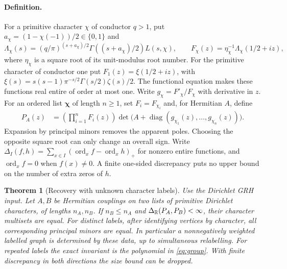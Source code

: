 \documentclass[11pt]{article}
\newtheorem{theorem}{Theorem}[section]
\theoremstyle{remark}\newtheorem{remark}[theorem]{Remark}
\DeclareMathOperator{\ord}{ord}
\DeclareMathOperator{\diag}{diag}
\begin{document}
\paragraph{Definition.}
For a primitive character $\chi$ of conductor $q>1$, put $a_\chi=(1-\chi(-1))/2\in\{0,1\}$ and
\[
 \Lambda_\chi(s)=(q/\pi)^{(s+a_\chi)/2}
       \Gamma((s+a_\chi)/2)L(s,\chi),\qquad
 F_\chi(z)=\eta_\chi^{-1}\Lambda_\chi(1/2+iz),
\]
where $\eta_\chi$ is a square root of its unit-modulus root number. For the primitive character of conductor one put $F_1(z)=\xi(1/2+iz)$, with $\xi(s)=s(s-1)\pi^{-s/2}\Gamma(s/2)\zeta(s)/2$. The functional equation makes these functions real entire of order at most one. Write $g_\chi=F'_\chi/F_\chi$ with derivative in $z$. For an ordered list $\boldsymbol\chi$ of length $n\ge1$, set $F_i=F_{\chi_i}$ and, for Hermitian $A$, define
\begin{align}
 P_A(z)&=\left(\prod_{i=1}^n F_i(z)\right)
 \det\bigl(A+\diag(g_{\chi_1}(z),\ldots,g_{\chi_n}(z))\bigr). \label{eq:model}
\end{align}
Expansion by principal minors removes the apparent poles. Choosing the opposite square root can only change an overall sign. Write $\Delta_I(f,h)=\sum_{x\in I}(\ord_x f-\ord_x h)_+$ for nonzero entire functions, and $\ord_x f=0$ when $f(x)\ne0$. A finite one-sided discrepancy puts no upper bound on the number of extra zeros of $h$.

\begin{theorem}[Recovery with unknown character labels]\label{thm:overview}
Use the Dirichlet GRH input. Let $A,B$ be Hermitian couplings on two lists of primitive Dirichlet characters, of lengths $n_A,n_B$. If $n_B\le n_A$ and $\Delta_\mathbb R(P_A,P_B)<\infty$, their character multisets are equal. For distinct labels, after identifying vertices by character, all corresponding principal minors are equal. In particular a nonnegatively weighted labelled graph is determined by these data, up to simultaneous relabelling. For repeated labels the exact invariant is the polynomial in \eqref{eq:group}. With finite discrepancy in both directions the size bound can be dropped.
\end{theorem}
\end{document}
